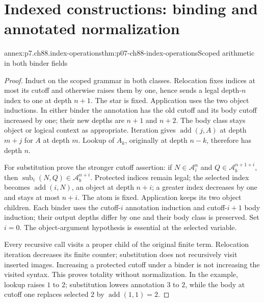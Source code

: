 \section{Indexed constructions: binding and annotated normalization}
\label{sec:annex-p07-ch88}

\begin{annexitem}{annex:p7.ch88.index-operations}{thm:p07-ch88-index-operations}{Scoped arithmetic in both binder fields}
\begin{proof}
Induct on the scoped grammar in both classes. Relocation fixes indices at most its cutoff and otherwise raises them by one, hence sends a legal depth-\(n\) index to one at depth \(n+1\). The star is fixed. Application uses the two object inductions. In either binder the annotation has the old cutoff and its body cutoff increased by one; their new depths are \(n+1\) and \(n+2\). The body class stays object or logical context as appropriate. Iteration gives \(\operatorname{add}(j,A)\) at depth \(m+j\) for \(A\) at depth \(m\). Lookup of \(A_k\), originally at depth \(n-k\), therefore has depth \(n\).

For substitution prove the stronger cutoff assertion: if \(N\in\mathcal A_i^n\) and \(Q\in\mathcal A_b^{n+1+i}\), then \(\operatorname{sub}_i(N,Q)\in\mathcal A_b^{n+i}\).
Protected indices remain legal; the selected index becomes \(\operatorname{add}(i,N)\), an object at depth \(n+i\); a greater index decreases by one and stays at most \(n+i\). The atom is fixed. Application keeps its two object children. Each binder uses the cutoff-\(i\) annotation induction and cutoff-\(i+1\) body induction; their output depths differ by one and their body class is preserved. Set \(i=0\). The object-argument hypothesis is essential at the selected variable.

Every recursive call visits a proper child of the original finite term. Relocation iteration decreases its finite counter; substitution does not recursively visit inserted images. Increasing a protected cutoff under a binder is not increasing the visited syntax. This proves totality without normalization. In the example, lookup raises \(1\) to \(2\); substitution lowers annotation \(3\) to \(2\), while the body at cutoff one replaces selected \(2\) by \(\operatorname{add}(1,1)=2\).
\end{proof}
\end{annexitem}

